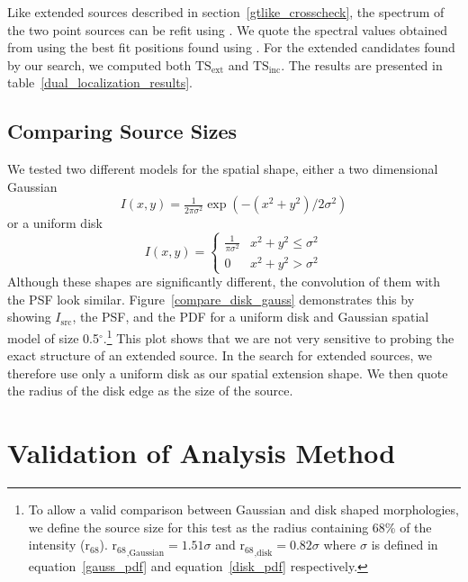 \documentclass[12pt,preprint]{aastex}
\newcommand{\tsext}{{\ensuremath{\text{TS}_{\text{ext}}}}\xspace}
\newcommand{\tsinc}{\ensuremath{\text{TS}_{\text{inc}}}\xspace}
\newcommand{\rsixeight}{{\ensuremath{\text{r}_{68}}}\xspace}
\renewcommand{\deg}{\ensuremath{^\circ}\xspace}
\newcommand{\pointlike}{\text{\em pointlike}\xspace}
\newcommand{\gtlike}{\text{\em gtlike}\xspace}
\begin{document}
Like extended sources described in section~\ref{gtlike_crosscheck},
the spectrum of the two point sources can be refit using \gtlike.
We quote the spectral values obtained from \gtlike using the best fit
positions found using \pointlike.  For the extended candidates found
by our search, we computed both \tsext and \tsinc.  The results are
presented in table~\ref{dual_localization_results}.

\subsection{Comparing Source Sizes}

\label{compare_source_size}

We tested two different models for the
spatial shape, either a two dimensional Gaussian
\begin{equation}\label{gauss_pdf}
  I(x,y)=\tfrac{1}{2\pi\sigma^2}\exp\left(-(x^2+y^2)/2\sigma^2\right)
\end{equation}
or a uniform disk
\begin{equation}\label{disk_pdf}
  I(x,y)=
  \begin{cases}
    \frac{1}{\pi\sigma^2} & x^2+y^2\le\sigma^2 \\
    0                      & x^2+y^2>\sigma^2
  \end{cases}
\end{equation}
Although these shapes are significantly different, the convolution
of them with the PSF look similar.  Figure~\ref{compare_disk_gauss}
demonstrates this by showing $I_\text{src}$, the PSF, and the PDF for
a uniform disk and Gaussian spatial model of size 0.5\deg.\footnote{To
allow a valid comparison between Gaussian and disk shaped morphologies,
we define the source size for this test as the radius containing
68\% of the intensity ($\rsixeight$).  $\rsixeight_\text{,Gaussian}=1.51\sigma$
and $\rsixeight_\text{,disk}=0.82\sigma$ where $\sigma$
is defined in equation~\ref{gauss_pdf} and
equation~\ref{disk_pdf} respectively.} This plot shows that we are
not very sensitive to probing the exact structure of an extended source.
In the search for extended sources, we therefore use only a uniform
disk as our spatial extension shape. We then quote the radius of the
disk edge as the size of the source.

\section{Validation of Analysis Method}
\end{document}
